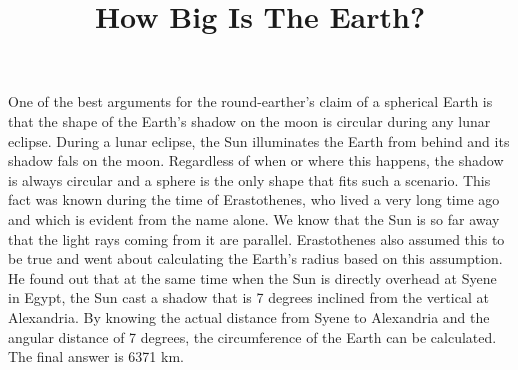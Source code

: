 \documentclass{../template/texnote}
\title{How Big Is The Earth?}
\begin{document}
    \maketitle {}
One of the best arguments for the round-earther's claim of a spherical Earth is that the shape of the Earth's shadow on the moon is circular during any lunar eclipse.
During a lunar eclipse, the Sun illuminates the Earth from behind and its shadow fals on the moon.
Regardless of when or where this happens, the shadow is always circular and a sphere is the only shape that fits such a scenario.
This fact was known during the time of Erastothenes, who lived a very long time ago and which is evident from the name alone.
We know that the Sun is so far away that the light rays coming from it are parallel.
Erastothenes also assumed this to be true and went about calculating the Earth's radius based on this assumption.
He found out that at the same time when the Sun is directly overhead at Syene in Egypt, the Sun cast a shadow that is 7 degrees inclined from the vertical at Alexandria.
By knowing the actual distance from Syene to Alexandria and the angular distance of 7 degrees, the circumference of the Earth can be calculated.
The final answer is 6371 km.

    \printbibliography
\end{document}
